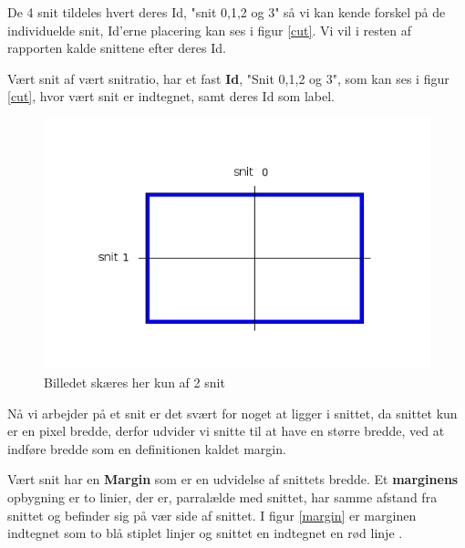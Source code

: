 De 4 snit tildeles hvert deres Id, "snit 0,1,2 og 3" så vi kan kende
forskel på de individuelde snit, Id'erne placering kan ses i figur
\ref{cut}. Vi vil i resten af rapporten kalde snittene efter deres Id.

\begin{definition}
	Vært snit af vært snitratio, har et fast \textbf{Id}, "Snit 0,1,2 og 3", som kan ses i figur \ref{cut}, hvor vært snit er indtegnet, samt deres Id som label. 
\end{definition}

\begin{figure}[h]
	\begin{center}
		\includegraphics[scale=0.42,angle=0]{afsnit/vores_implementation/billeder/naiv_algoritme/2Cut}
	\end{center}
	\caption[]{Billedet skæres her kun af 2 snit}
	\label{2Cut}
\end{figure}

Nå vi arbejder på et snit er det svært for noget at ligger i snittet, da
snittet kun er en pixel bredde, derfor udvider vi snitte til at have en
større bredde, ved at indføre bredde som en definitionen kaldet margin. 

\begin{definition}
	Vært snit har en \textbf{Margin} som er en udvidelse af snittets bredde. Et \textbf{marginens} opbygning er to linier, der er,
	parralælde med snittet, har samme afstand fra snittet og befinder
	sig på vær side af snittet. I figur \ref{margin} er marginen indtegnet som
	to blå stiplet linjer og snittet en indtegnet en rød linje . 
\end{definition}

